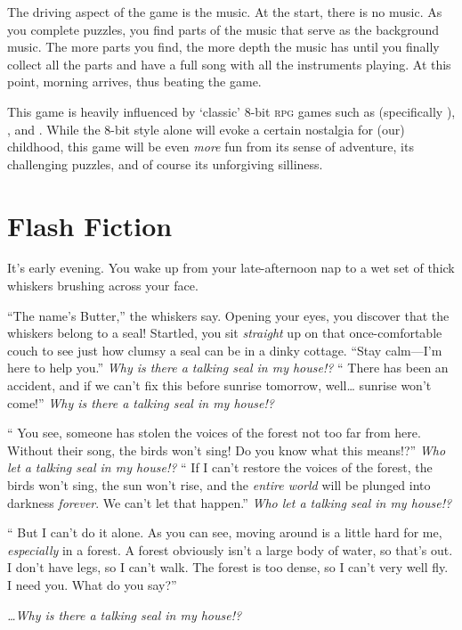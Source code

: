 \documentclass[letterpaper,twocolumn]{article}
\begin{document}
The driving aspect of the game is the music.
At the start, there is no music.
As you complete puzzles, you find parts of the music that serve as the background music.
The more parts you find, the more depth the music has until you finally collect all the parts and have a full song with all the instruments playing.
At this point, morning arrives, thus beating the game.

This game is heavily influenced by \enquote*{classic} 8-bit \textsc{rpg} games
  such as 
  (specifically ),
  , and
  .
While the 8-bit style alone will evoke a certain nostalgia for (our) childhood,
  this game will be even \emph{more} fun from its sense of adventure,
  its challenging puzzles, and of course
  its unforgiving silliness.

\section{Flash Fiction}
\label{sec:flash-fiction}

\def\thought{\textsl}

It's early evening.
You wake up from your late-afternoon nap to
  a wet set of thick whiskers
  brushing across your face.

\enquote{The name's Butter,} the whiskers say.
Opening your eyes, you discover that the whiskers belong to a seal!
Startled, you sit \emph{straight} up on that once-comfortable couch
  to see just how clumsy a seal can be in a dinky cottage.
\enquote{Stay calm---I'm here to help you.}
\thought{Why is there a talking seal in my house!?}
\enquote{%
  There has been an accident, and
  if we can't fix this before sunrise tomorrow, well\dots
  sunrise won't come!}
\thought{Why is there a talking seal in my house!?}

\enquote{%
  You see, someone has stolen
  the voices of the forest
  not too far from here.
  Without their song, the birds won't sing!
  Do you know what this means!?}
\thought{Who let a talking seal in my house!?}
\enquote{%
  If I can't restore the
  voices of the forest,
  the birds won't sing,
  the sun won't rise,
  and the \emph{entire world} will be
  plunged into darkness \emph{forever}.
  We can't let that happen.}
\thought{Who let a talking seal in my house!?}

\enquote{%
  But I can't do it alone.
  As you can see, moving around is a little hard for me, \emph{especially} in a forest.
  A forest obviously isn't a large body of water, so that's out.
  I don't have legs, so I can't walk.
  The forest is too dense, so I can't very well fly.
  I need you.
  What do you say?}

\vfill

\centerline{\thought{\dots Why is there a talking seal in my house!?}}

\vfill
\end{document}
